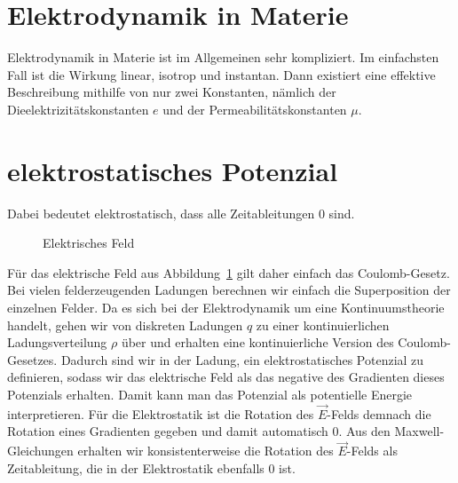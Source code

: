 \documentclass{../../theo-lecture/lecture}
\begin{document}
    \section{Elektrodynamik in Materie}
    Elektrodynamik in Materie ist im Allgemeinen sehr kompliziert.
    Im einfachsten Fall ist die Wirkung linear, isotrop und instantan.
    Dann existiert eine effektive Beschreibung mithilfe von nur zwei Konstanten, nämlich der Dieelektrizitätskonstanten $e$ und der Permeabilitätskonstanten $\mu$.
    \section{elektrostatisches Potenzial}
    Dabei bedeutet elektrostatisch, dass alle Zeitableitungen 0 sind.
    \begin{figure}[h]
        \centering
        \caption{Elektrisches Feld}
        \label{efeld}
    \end{figure}
    Für das elektrische Feld aus Abbildung~\ref{efeld} gilt daher einfach das Coulomb-Gesetz. 
    Bei vielen felderzeugenden Ladungen berechnen wir einfach die Superposition der einzelnen Felder.
    Da es sich bei der Elektrodynamik um eine Kontinuumstheorie handelt, gehen wir von diskreten Ladungen $q$ zu einer kontinuierlichen Ladungsverteilung $\rho$ über und erhalten eine kontinuierliche Version des Coulomb-Gesetzes.
    Dadurch sind wir in der Ladung, ein elektrostatisches Potenzial zu definieren, sodass wir das elektrische Feld als das negative des Gradienten dieses Potenzials erhalten. Damit kann man das Potenzial als potentielle Energie interpretieren.
    Für die Elektrostatik ist die Rotation des $\vec E$-Felds demnach die Rotation eines Gradienten gegeben und damit automatisch 0. Aus den Maxwell-Gleichungen erhalten wir konsistenterweise die Rotation des $\vec E$-Felds als Zeitableitung, die in der Elektrostatik ebenfalls 0 ist.
\end{document}
